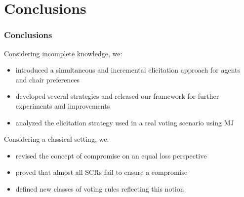 \documentclass[aspectratio=169]{beamer}
\begin{document}
\section{Conclusions}
\begin{frame}
	\frametitle{Conclusions}
\begin{block}{Considering incomplete knowledge, we:}
	\begin{itemize}
	\item introduced a simultaneous and incremental elicitation approach for agents and chair preferences
	\item developed several strategies and released our framework for further experiments and improvements
	\item analyzed the elicitation strategy used in a real voting scenario using MJ
	\end{itemize}
\end{block}
\begin{block}{Considering a classical setting, we:}
	\begin{itemize}
		\item revised the concept of compromise on an equal loss perspective
		\item proved that almost all SCRs fail to ensure a compromise
		\item defined new classes of voting rules reflecting this notion
	\end{itemize}
\end{block}
\end{frame}
\end{document}
